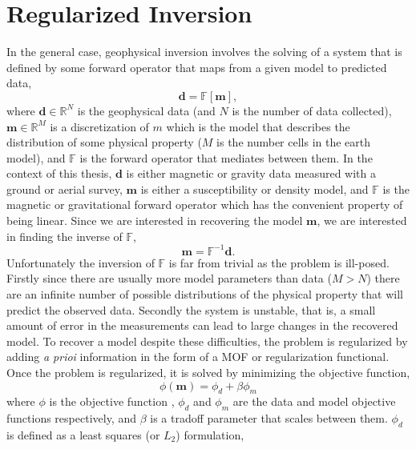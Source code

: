 \section{Regularized Inversion}
\label{sec:Regularized Inversion}

In the general case, geophysical inversion involves the solving of a system that is defined by some forward operator that maps from a given model to predicted data,
\begin{equation}
\mathbf d = \mathbb F [\mathbf m],
\end{equation}
\label{eq:forwardProb}
where $\mathbf d \in \mathbb R^N$ is the geophysical data (and $N$ is the number of data collected),  $\mathbf m \in \mathbb R^M$ is a discretization of $m$ which is the model that describes the distribution of some physical property ($M$ is the number cells in the earth model), and $\mathbb F$ is the forward operator that mediates between them. In the context of this thesis, $\mathbf d$ is  either magnetic or gravity data measured with a ground or aerial survey, $\mathbf m$ is either a susceptibility or density model, and $\mathbb F$ is the magnetic or gravitational forward operator which has the convenient property of being linear. Since we are interested in recovering the model $\mathbf m$, we are interested in finding the inverse of $\mathbb F$,
\begin{equation}
\mathbf m= \mathbb F^{-1}\mathbf d.
\end{equation}
\label{eq:inverseProb}
Unfortunately the inversion of $\mathbb F$ is far from trivial as the problem is ill-posed. Firstly since there are usually more model parameters than data ($M > N$) there are an infinite number of possible distributions of the physical property that will predict the observed data. Secondly the system is unstable, that is, a small amount of error in the measurements can lead to large changes in the recovered model. To recover a model despite these difficulties, the problem is regularized by adding \emph{a prioi} information in the form of a \ac{MOF} or regularization functional. Once the problem is regularized, it is solved by minimizing the objective function,
\begin{equation}
\phi(\mathbf m) = \phi_d + \beta \phi_m
\end{equation}
\label{eq:objectiveFunc}
where $\phi$ is the objective function , $\phi_d$ and $\phi_m$ are the data and model objective functions respectively, and $\beta$ is a tradoff parameter that scales between them. $\phi_d$ is defined as a least squares (or $L_2$) formulation,
